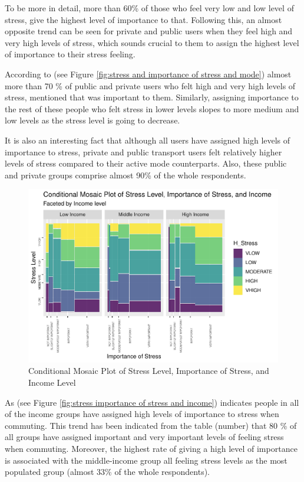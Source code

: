 \documentclass[
11pt, %
oneside, %
english, %
singlespacing, %
]{macthesis} %
\begin{document}
To be more in detail, more than 60\% of those who feel very low and low level of stress, give the highest level of importance to that. Following this, an almost opposite trend can be seen for private and public users when they feel high and very high levels of stress, which sounds crucial to them to assign the highest level of importance to their stress feeling.

According to (see Figure \ref{fig:stress and importance of stress and mode}) almost more than 70 \% of public and private users who felt high and very high levels of stress, mentioned that was important to them. Similarly, assigning importance to the rest of these people who felt stress in lower levels slopes to more medium and low levels as the stress level is going to decrease.

It is also an interesting fact that although all users have assigned high levels of importance to stress, private and public transport users felt relatively higher levels of stress compared to their active mode counterparts. Also, these public and private groups comprise almost 90\% of the whole respondents.
\begin{figure}
\includegraphics[width=0.85\linewidth]{thesis_files/figure-latex/unnamed-chunk-29-1} \caption{\label{fig:stress importance of stress and income}Conditional Mosaic Plot of Stress Level, Importance of Stress, and Income Level}\label{fig:unnamed-chunk-29}
\end{figure}
As (see Figure \ref{fig:stress importance of stress and income}) indicates people in all of the income groups have assigned high levels of importance to stress when commuting. This trend has been indicated from the table (number) that 80 \% of all groups have assigned important and very important levels of feeling stress when commuting. Moreover, the highest rate of giving a high level of importance is associated with the middle-income group all feeling stress levels as the most populated group (almost 33\% of the whole respondents).
\end{document}
